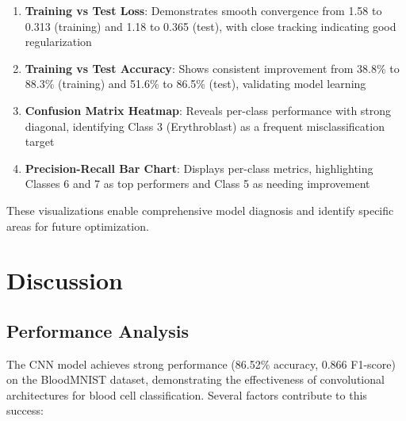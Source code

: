 \documentclass[runningheads]{llncs}
\begin{document}
\begin{enumerate}
    \item \textbf{Training vs Test Loss}: Demonstrates smooth convergence from 1.58 to 0.313 (training) and 1.18 to 0.365 (test), with close tracking indicating good regularization
    
    \item \textbf{Training vs Test Accuracy}: Shows consistent improvement from 38.8\% to 88.3\% (training) and 51.6\% to 86.5\% (test), validating model learning
    
    \item \textbf{Confusion Matrix Heatmap}: Reveals per-class performance with strong diagonal, identifying Class 3 (Erythroblast) as a frequent misclassification target
    
    \item \textbf{Precision-Recall Bar Chart}: Displays per-class metrics, highlighting Classes 6 and 7 as top performers and Class 5 as needing improvement
\end{enumerate}

These visualizations enable comprehensive model diagnosis and identify specific areas for future optimization.

\section{Discussion}

\subsection{Performance Analysis}

The CNN model achieves strong performance (86.52\% accuracy, 0.866 F1-score) on the BloodMNIST dataset, demonstrating the effectiveness of convolutional architectures for blood cell classification. Several factors contribute to this success:
\end{document}

